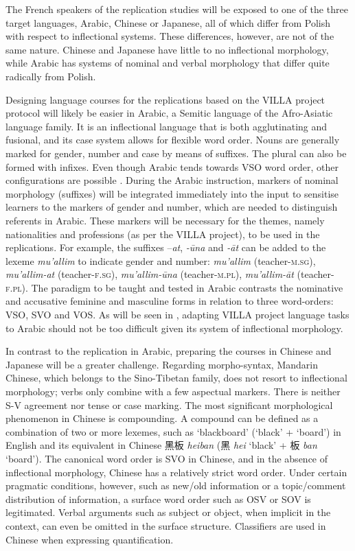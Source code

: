 \documentclass[output=paper,colorlinks,citecolor=brown,modfonts,nonflat]{../langscibook}
\begin{document}
The French speakers of the replication studies will be exposed to one of the three target languages, Arabic, Chinese or Japanese, all of which differ from Polish with respect to inflectional systems. These differences, however, are not of the same nature. Chinese and Japanese have little to no inflectional morphology, while Arabic has systems of nominal and verbal morphology that differ quite radically from Polish.

Designing language courses for the replications based on the VILLA project protocol will likely be easier in Arabic, a Semitic language of the Afro-Asiatic language family. It is an inflectional language that is both agglutinating and fusional, and its case system allows for flexible word order.  Nouns are generally marked for gender, number and case by means of suffixes. The plural can also be formed with infixes. Even though Arabic tends towards VSO word order, other configurations are possible \citep{Ryding2005}. During the Arabic instruction, markers of nominal morphology (suffixes) will be integrated immediately into the input to sensitise learners to the markers of gender and number, which are needed to distinguish referents in Arabic. These markers will be necessary for the themes, namely nationalities and professions (as per the VILLA project), to be used in the replications. For example, the suffixes –\textit{at}, \textit{{}-ūna} and \textit{{}-āt} can be added to the lexeme \textit{mu’allim} to indicate gender and number: \textit{mu’allim} (teacher-\textsc{m.sg}), \textit{mu’allim-at} (teacher-\textsc{f.sg}), \textit{mu’allim-ūna} (teacher-\textsc{m.pl}), \textit{mu’allim-āt} (teacher-\textsc{f.pl}). The paradigm to be taught and tested in Arabic contrasts the nominative and accusative feminine and masculine forms in relation to three word-orders: VSO, SVO and VOS. As will be seen in , adapting VILLA project language tasks to Arabic should not be too difficult given its system of inflectional morphology.

In contrast to the replication in Arabic, preparing the courses in Chinese and Japanese will be a greater challenge. Regarding morpho-syntax, Mandarin Chinese, which belongs to the Sino-Tibetan family, does not resort to inflectional morphology; verbs only combine with a few aspectual markers. There is neither S-V agreement nor tense or case marking. The most significant morphological phenomenon in Chinese is compounding. A compound can be defined as a combination of two or more lexemes, such as ‘blackboard’ (‘black’ + ‘board’) in English and its equivalent in Chinese {\cjkfont 黑板} \textit{heiban} ({\cjkfont 黑} \textit{hei} ‘black’ + {\cjkfont 板} \textit{ban} ‘board’). The canonical word order is SVO in Chinese, and in the absence of inflectional morphology, Chinese has a relatively strict word order. Under certain pragmatic conditions, however, such as new/old information or a topic/comment distribution of information, a surface word order such as OSV or SOV is legitimated. Verbal arguments such as subject or object, when implicit in the context, can even be omitted in the surface structure. Classifiers are used in Chinese when expressing quantification.
\end{document}
